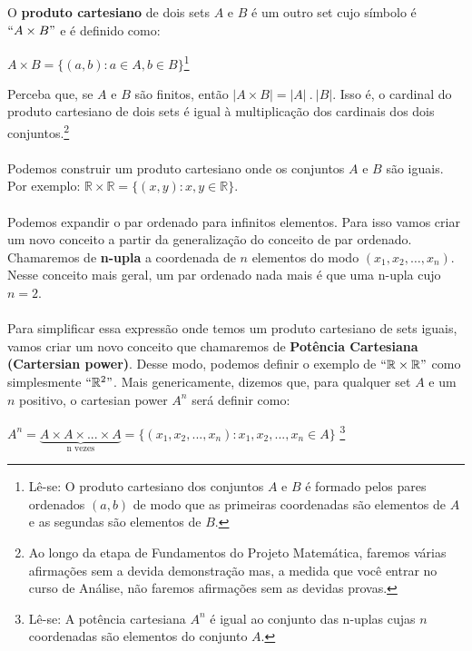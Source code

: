 \documentclass[main.tex]{subfiles}
\begin{document}
\begin{definition}
O \textbf{produto cartesiano} de dois sets $A$ e $B$ é um outro set cujo símbolo é $``A \times B"$ e é definido como:
\begin{center}
$A \times B = \{ (a,b) : a \in A, b \in B \}$\footnote{Lê-se: O produto cartesiano dos conjuntos $A$ e $B$ é formado pelos pares ordenados $(a,b)$ de modo que as primeiras coordenadas são elementos de $A$ e as segundas são elementos de $B$.}
\end{center}
\end{definition}

Perceba que, se $A$ e $B$ são finitos, então $| A \times B | = |A| \ . \ |B|$. Isso é, o cardinal do produto cartesiano de dois sets é igual à multiplicação dos cardinais dos dois conjuntos.\footnote{Ao longo da etapa de Fundamentos do Projeto Matemática, faremos várias afirmações sem a devida demonstração mas, a medida que você entrar no curso de Análise, não faremos afirmações sem as devidas provas.}
\\~\\
Podemos construir um produto cartesiano onde os conjuntos $A$ e $B$ são iguais. Por exemplo: $\mathbb{R} \times \mathbb{R} = \{ (x,y) : x,y \in \mathbb{R} \}$.
\\~\\
Podemos expandir o par ordenado para infinitos elementos. Para isso vamos criar um novo conceito a partir da generalização do conceito de par ordenado. Chamaremos de \textbf{n-upla} a coordenada de $n$ elementos do modo $(x_1, x_2, \dots, x_n)$. Nesse conceito mais geral, um par ordenado nada mais é que uma n-upla cujo $n = 2$.
\\~\\
Para simplificar essa expressão onde temos um produto cartesiano de sets iguais, vamos criar um novo conceito que chamaremos de \textbf{Potência Cartesiana (Cartersian power)}. Desse modo, podemos definir o exemplo de $``\mathbb{R} \times \mathbb{R}"$ como simplesmente $``\mathbb{R}^2"$. Mais genericamente, dizemos que, para qualquer set $A$ e um $n$ positivo, o cartesian power $A^n$ será definir como:

\begin{center}
	$ A^n = \underbrace{A \times A \times ... \times A}_\text{n \ vezes} = \{ (x_1,x_2, ... , x_n) : x_1,x_2, ... , x_n \in A \} $ \footnote{Lê-se: A potência cartesiana $A^n$ é igual ao conjunto das n-uplas cujas $n$ coordenadas são elementos do conjunto $A$.}
\end{center}
\end{document}

